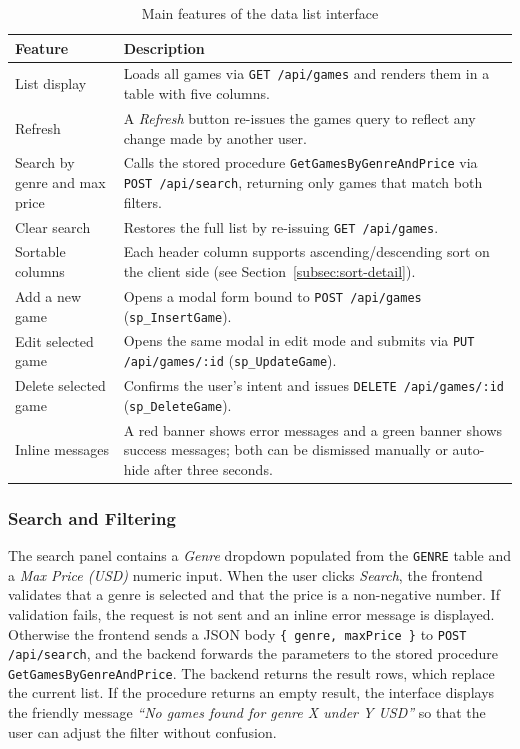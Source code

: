 \begin{table}[H]
\centering
\caption{Main features of the data list interface}
\label{tab:gamelist-features}
\begin{tabular}{|l|p{9cm}|}
\hline
\textbf{Feature} & \textbf{Description} \\ \hline
List display & Loads all games via \texttt{GET /api/games} and renders them in a table with five columns. \\ \hline
Refresh & A \textit{Refresh} button re-issues the games query to reflect any change made by another user. \\ \hline
Search by genre and max price & Calls the stored procedure \texttt{GetGamesByGenreAndPrice} via \texttt{POST /api/search}, returning only games that match both filters. \\ \hline
Clear search & Restores the full list by re-issuing \texttt{GET /api/games}. \\ \hline
Sortable columns & Each header column supports ascending/descending sort on the client side (see Section~\ref{subsec:sort-detail}). \\ \hline
Add a new game & Opens a modal form bound to \texttt{POST /api/games} (\texttt{sp\_InsertGame}). \\ \hline
Edit selected game & Opens the same modal in edit mode and submits via \texttt{PUT /api/games/:id} (\texttt{sp\_UpdateGame}). \\ \hline
Delete selected game & Confirms the user's intent and issues \texttt{DELETE /api/games/:id} (\texttt{sp\_DeleteGame}). \\ \hline
Inline messages & A red banner shows error messages and a green banner shows success messages; both can be dismissed manually or auto-hide after three seconds. \\ \hline
\end{tabular}
\end{table}

\subsubsection{Search and Filtering}

The search panel contains a \textit{Genre} dropdown populated from the \texttt{GENRE} table and a \textit{Max Price (USD)} numeric input. When the user clicks \textit{Search}, the frontend validates that a genre is selected and that the price is a non-negative number. If validation fails, the request is not sent and an inline error message is displayed. Otherwise the frontend sends a JSON body \texttt{\{ genre, maxPrice \}} to \texttt{POST /api/search}, and the backend forwards the parameters to the stored procedure \texttt{GetGamesByGenreAndPrice}. The backend returns the result rows, which replace the current list. If the procedure returns an empty result, the interface displays the friendly message \textit{``No games found for genre X under Y USD''} so that the user can adjust the filter without confusion.

